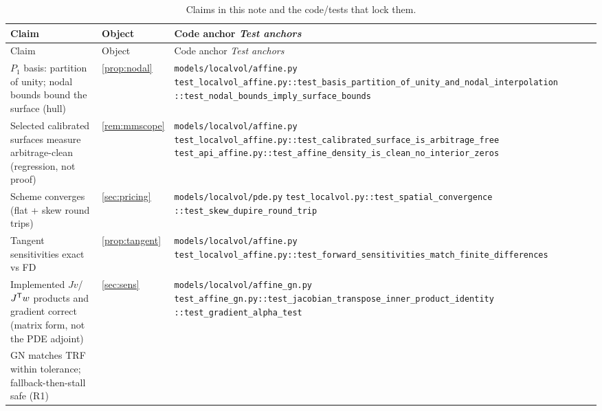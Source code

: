 \documentclass[11pt]{article}
\begin{document}
\begingroup
\small
\setlength{\tabcolsep}{4pt}
\renewcommand{\arraystretch}{1.15}
\begin{longtable}{@{}p{}p{}p{}@{}}
\caption{Claims in this note and the code/tests that lock them.}\\
\toprule Claim & Object & Code anchor \newline \emph{Test anchors}\\ \midrule
\endfirsthead
\toprule Claim & Object & Code anchor \newline \emph{Test anchors}\\ \midrule
\endhead
$P_1$ basis: partition of unity; nodal bounds bound the surface (hull) &
\cref{prop:nodal} &
\nolinkurl{models/localvol/affine.py}\newline
\nolinkurl{test_localvol_affine.py::test_basis_partition_of_unity_and_nodal_interpolation}\newline
\nolinkurl{::test_nodal_bounds_imply_surface_bounds}\\
\addlinespace
Selected calibrated surfaces measure arbitrage-clean (regression, not proof) &
\cref{rem:mmscope} &
\nolinkurl{models/localvol/affine.py}\newline
\nolinkurl{test_localvol_affine.py::test_calibrated_surface_is_arbitrage_free}\newline
\nolinkurl{test_api_affine.py::test_affine_density_is_clean_no_interior_zeros}\\
\addlinespace
Scheme converges (flat + skew round trips) &
\cref{sec:pricing} &
\nolinkurl{models/localvol/pde.py}\newline
\nolinkurl{test_localvol.py::test_spatial_convergence}\newline
\nolinkurl{::test_skew_dupire_round_trip}\\
\addlinespace
Tangent sensitivities exact vs FD &
\cref{prop:tangent} &
\nolinkurl{models/localvol/affine.py}\newline
\nolinkurl{test_localvol_affine.py::test_forward_sensitivities_match_finite_differences}\\
\addlinespace
Implemented $Jv$/$J^{\mathsf{T}} w$ products and gradient correct (matrix form, not the
PDE adjoint) &
\cref{sec:sens} &
\nolinkurl{models/localvol/affine_gn.py}\newline
\nolinkurl{test_affine_gn.py::test_jacobian_transpose_inner_product_identity}\newline
\nolinkurl{::test_gradient_alpha_test}\\
\addlinespace
GN matches TRF within tolerance; fallback-then-stall safe (R1) &

\end{longtable}
\end{document}
